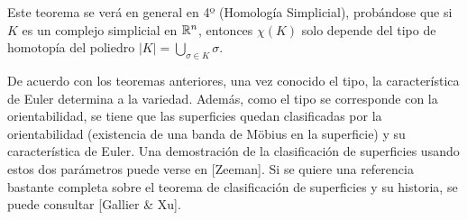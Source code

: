 \documentclass[GTS.tex]{subfiles}
\begin{document}
Este teorema se verá en general en 4º (Homología Simplicial), probándose que si $K$ es un complejo simplicial en $\mathbb{R}^n$, entonces $\chi(K)$ solo depende del tipo de homotopía del poliedro $|K|=\underset{\sigma\in K}{\bigcup}\sigma$.


\begin{nota} De acuerdo con los teoremas anteriores, una vez conocido el tipo, la característica de Euler determina a la variedad. Además, como el tipo se corresponde con la orientabilidad, se tiene que las superficies quedan clasificadas por la orientabilidad (existencia de una banda de Möbius en la superficie) y su característica de Euler. Una demostración de la clasificación de superficies usando estos dos parámetros puede verse en [Zeeman]. Si se quiere una referencia bastante completa sobre el teorema de clasificación de superficies y su historia, se puede consultar [Gallier \& Xu].
\end{nota}
\end{document}
